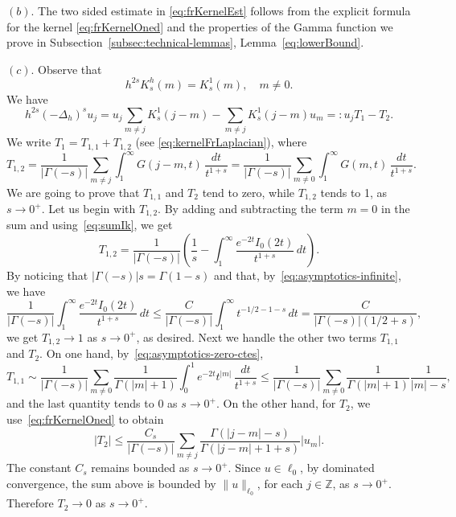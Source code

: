\documentclass[a4paper,11pt,reqno]{amsart}
\newcommand{\Z}{\mathbb{Z}}
\theoremstyle{definition}
\numberwithin{equation}{section}
\begin{document}
\noindent$(b)$. The two sided estimate in \eqref{eq:frKernelEst} follows from
the explicit formula for the kernel \eqref{eq:frKernelOned} and the properties of the Gamma function
we prove in Subsection~\ref{subsec:technical-lemmas}, Lemma~\ref{eq:lowerBound}.

\noindent$(c)$. Observe that
\begin{equation}
\label{relacionhy1}
h^{2s}K^h_s(m)=K_s^1(m),\quad m\neq0.
\end{equation}
We have
\[
h^{2s}(-\Delta_h)^su_{j} =
u_{j}\sum_{m\neq j} K^1_s(j-m) -\sum_{m\neq j}K^1_s(j-m)u_{m} =: u_{j}T_1-T_2.
\]
We write $T_1=T_{1,1}+T_{1,2}$ (see \eqref{eq:kernelFrLaplacian}), where
\[
T_{1,2} = \frac{1}{|\Gamma(-s)|} \sum_{m\neq j} \int_1^\infty G(j-m,t)\,\frac{dt}{t^{1+s}}=
\frac{1}{|\Gamma(-s)|} \sum_{m\neq 0} \int_1^\infty G(m,t)\,\frac{dt}{t^{1+s}}.
\]
We are going to prove that $T_{1,1}$ and $T_2$ tend to zero, while $T_{1,2}$ tends to 1,
as $s\to0^+$. Let us begin with $T_{1,2}$. By adding and subtracting the term $m=0$ in the sum
and using~\eqref{eq:sumIk}, we get
\[
T_{1,2} = \frac{1}{|\Gamma(-s)|}\left(\frac{1}{s}-\int_1^\infty \frac{e^{-2t} {I_0(2t)}}{t^{1+s}}\,dt\right).
\]
By noticing that $|\Gamma(-s)|s=\Gamma(1-s)$ and that, by~\eqref{eq:asymptotics-infinite}, we have
\[
\frac{1}{|\Gamma(-s)|} \int_1^\infty \frac{e^{-2t} {I_0(2t)}}{t^{1+s}}\,dt
\le \frac{C}{|\Gamma(-s)|} \int_{1}^{\infty}t^{-1/2-1-s}\,dt
= \frac{C}{|\Gamma(-s)|(1/2+s)},
\]
we get $T_{1,2}\to 1$ as $s\to0^+$, as desired. Next we handle the other two terms $T_{1,1}$ and $T_2$.
On one hand, by~\eqref{eq:asymptotics-zero-ctes},
$$
T_{1,1}\sim \frac{1}{|\Gamma(-s)|} \sum_{m\neq 0}
\frac{1}{\Gamma(|m|+1)} \int_0^1e^{-2t}t^{|m|}
\,\frac{dt}{t^{1+s}}
\le \frac{1}{|\Gamma(-s)|}
\sum_{m\neq 0} \frac{1}{\Gamma(|m|+1)} \frac{1}{|m|-s},
$$
and the last quantity tends to $0$ as $s\to 0^+$. On the other hand,
for $T_2$, we use~\eqref{eq:frKernelOned} to obtain
\[
|T_2|\le \frac{C_{s}}{|\Gamma(-s)|} \sum_{m\neq j}
\frac{\Gamma(|j-m|-s)}{\Gamma(|j-m|+1+s)}|u_{m}|.
\]
The constant $C_{s}$ remains bounded as $s\to0^+$.
Since $u\in \ell_0$, by dominated convergence, the sum
above is bounded by $\|u\|_{\ell_0}$, for each $j\in \Z$, as $s\to0^+$.
Therefore $T_2\to0$ as $s\to 0^+$.
\end{document}
